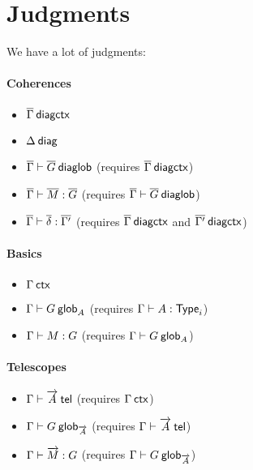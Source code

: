 \section{Judgments}

We have a lot of judgments:

\paragraph{Coherences}

\begin{small}
\begin{itemize}
\item ${\overline{\Gamma}} \: \mathsf{diagctx}$
\item $\Delta \: \mathsf{diag}$
\item ${\overline{\Gamma}} \vdash {\ensuremath{\overline{G}}} \: \mathsf{diaglob}$ (requires ${\overline{\Gamma}} \: \mathsf{diagctx}$)
\item ${\overline{\Gamma}} \vdash {\ensuremath{\overline{M}}} : {\overline{G}}$
(requires ${\overline{\Gamma}} \vdash {\ensuremath{\overline{G}}} \: \mathsf{diaglob}$)
\item ${\overline{\Gamma}} \vdash {\ensuremath{\overline{\delta}}} : {\overline{\Gamma'}}$
(requires ${\overline{\Gamma}} \: \mathsf{diagctx}$ and ${\overline{\Gamma'}} \: \mathsf{diagctx}$)
\end{itemize}
\end{small}

\paragraph{Basics}

\begin{small}
\begin{itemize}
\item ${\Gamma} \: \mathsf{ctx}$
\item ${\Gamma} \vdash {G} \: \mathsf{glob}_{A}$ (requires ${\Gamma} \vdash {A} : {\mathsf{Type}_{i}}$)
\item ${\Gamma} \vdash {M} : {G}$ (requires ${\Gamma} \vdash {G} \: \mathsf{glob}_{A}$)
\end{itemize}
\end{small}

\paragraph{Telescopes}

\begin{small}
\begin{itemize}
\item ${\Gamma} \vdash {\ensuremath{\overrightarrow{A}}} \: \mathsf{tel}$ (requires ${\Gamma} \: \mathsf{ctx}$)
\item ${\Gamma} \vdash {G} \: \mathsf{glob}_{\overrightarrow{A}}$ (requires ${\Gamma} \vdash {\ensuremath{\overrightarrow{A}}} \: \mathsf{tel}$)
\item ${\Gamma} \vdash {\ensuremath{\overrightarrow{M}}} : {G}$
(requires ${\Gamma} \vdash {G} \: \mathsf{glob}_{\overrightarrow{A}}$)
\end{itemize}
\end{small}

